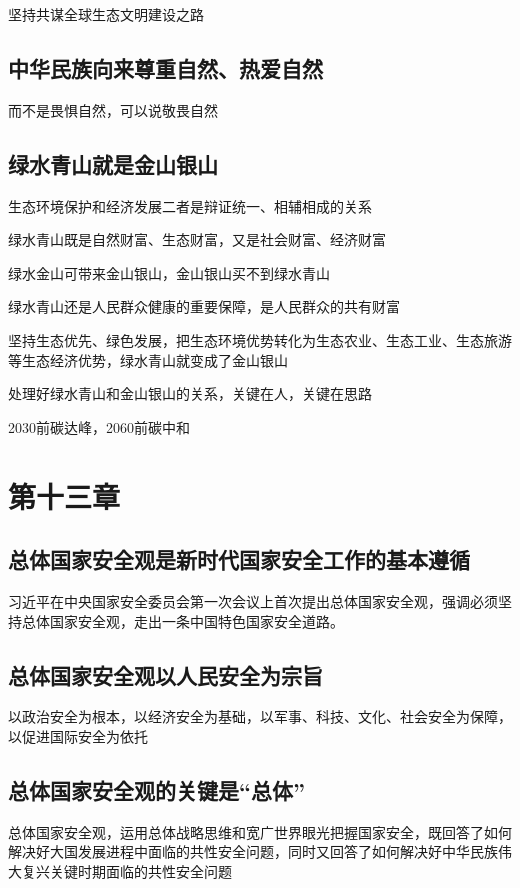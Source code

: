 \documentclass[11pt, a4paper]{article}
\begin{document}
坚持共谋全球生态文明建设之路

\subsection*{中华民族向来尊重自然、热爱自然}

而不是畏惧自然，可以说敬畏自然

\subsection*{绿水青山就是金山银山}

生态环境保护和经济发展二者是辩证统一、相辅相成的关系

绿水青山既是自然财富、生态财富，又是社会财富、经济财富

绿水金山可带来金山银山，金山银山买不到绿水青山

绿水青山还是人民群众健康的重要保障，是人民群众的共有财富

坚持生态优先、绿色发展，把生态环境优势转化为生态农业、生态工业、生态旅游等生态经济优势，绿水青山就变成了金山银山

处理好绿水青山和金山银山的关系，关键在人，关键在思路

2030前碳达峰，2060前碳中和

\section*{第十三章}

\subsection*{总体国家安全观是新时代国家安全工作的基本遵循}

习近平在中央国家安全委员会第一次会议上首次提出总体国家安全观，强调必须坚持总体国家安全观，走出一条中国特色国家安全道路。

\subsection*{总体国家安全观以人民安全为宗旨}

以政治安全为根本，以经济安全为基础，以军事、科技、文化、社会安全为保障，以促进国际安全为依托

\subsection*{总体国家安全观的关键是“总体”}

总体国家安全观，运用总体战略思维和宽广世界眼光把握国家安全，既回答了如何解决好大国发展进程中面临的共性安全问题，同时又回答了如何解决好中华民族伟大复兴关键时期面临的共性安全问题
\end{document}
